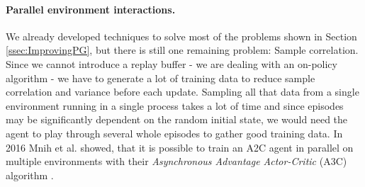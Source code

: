 \paragraph{Parallel environment interactions.}
We already developed techniques to solve most of the problems shown in Section \ref{ssec:ImprovingPG}, but there is still one remaining problem: Sample correlation. Since we cannot introduce a replay buffer - we are dealing with an on-policy algorithm - we have to generate a lot of training data to reduce sample correlation and variance before each update. Sampling all that data from a single environment running in a single process takes a lot of time and since episodes may be significantly dependent on the random initial state, we would need the agent to play through several whole episodes to gather good training data. In 2016 Mnih et al. showed, that it is possible to train an A2C agent in parallel on multiple environments with their \textit{Asynchronous Advantage Actor-Critic} (A3C) algorithm \cite{mnih2016asynchronous}.

